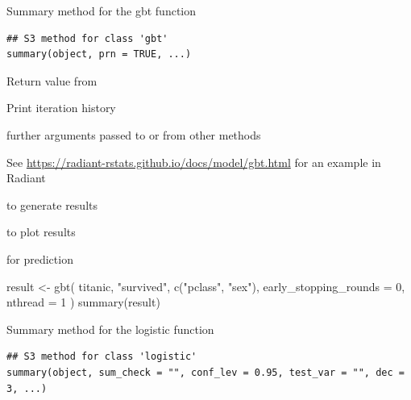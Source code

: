 \documentclass[a4paper]{book}
\begin{document}
%
\begin{Description}
Summary method for the gbt function
\end{Description}
%
\begin{Usage}
\begin{verbatim}
## S3 method for class 'gbt'
summary(object, prn = TRUE, ...)
\end{verbatim}
\end{Usage}
%
\begin{Arguments}
\begin{ldescription}
\item[\code{object}] Return value from 

\item[\code{prn}] Print iteration history

\item[\code{...}] further arguments passed to or from other methods
\end{ldescription}
\end{Arguments}
%
\begin{Details}
See \url{https://radiant-rstats.github.io/docs/model/gbt.html} for an example in Radiant
\end{Details}
%
\begin{SeeAlso}
 to generate results

 to plot results

 for prediction
\end{SeeAlso}
%
\begin{Examples}
\begin{ExampleCode}
result <- gbt(
  titanic, "survived", c("pclass", "sex"),
  early_stopping_rounds = 0, nthread = 1
)
summary(result)
\end{ExampleCode}
\end{Examples}
%
\begin{Description}
Summary method for the logistic function
\end{Description}
%
\begin{Usage}
\begin{verbatim}
## S3 method for class 'logistic'
summary(object, sum_check = "", conf_lev = 0.95, test_var = "", dec = 3, ...)
\end{verbatim}
\end{Usage}
%
\end{document}
